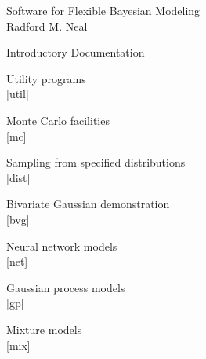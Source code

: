 

\pagestyle{empty}

\begin{center} 
\vspace*{1in}
 \huge Software for Flexible Bayesian Modeling \\[12pt]
 \Large Radford M. Neal \\
\end{center}

\pagebreak

\begin{center}
\vspace*{1in}
\huge Introductory Documentation
\end{center}

\pagebreak

\begin{center}
\vspace*{1in}
\huge Utility programs \\[8pt] [util]
\end{center}

\pagebreak

\begin{center}
\vspace*{1in}
\huge Monte Carlo facilities \\[8pt] [mc]
\end{center}

\pagebreak

\begin{center}
\vspace*{1in}
\huge Sampling from specified distributions \\[8pt] [dist]
\end{center}

\pagebreak

\begin{center}
\vspace*{1in}
\huge Bivariate Gaussian demonstration \\[8pt] [bvg]
\end{center}

\pagebreak

\begin{center}
\vspace*{1in}
\huge Neural network models \\[8pt] [net]
\end{center}

\pagebreak

\begin{center}
\vspace*{1in}
\huge Gaussian process models \\[8pt] [gp]
\end{center}

\pagebreak

\begin{center}
\vspace*{1in}
\huge Mixture models \\[8pt] [mix]
\end{center}



